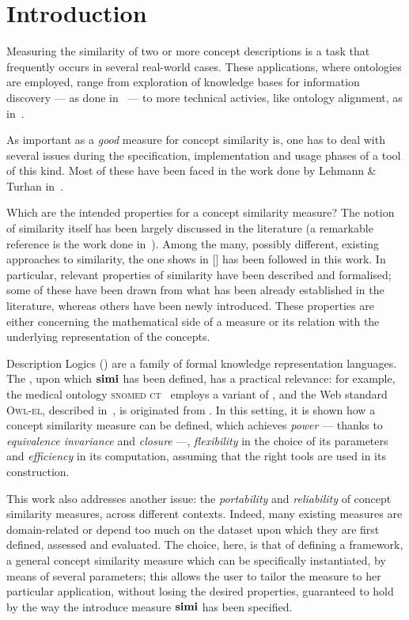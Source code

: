 \section{Introduction}
\label{sec:intro}

Measuring the similarity of two or more concept descriptions is a task that frequently occurs in several real-world cases.
These applications, where ontologies are employed, range from exploration of knowledge bases for information discovery --- as done in~\cite{GF13} --- to more technical activies, like ontology alignment, as in~\cite{CHu11}.


As important as a \emph{good} measure for concept similarity is, one has to deal with several issues during the specification, implementation and usage phases of a tool of this kind.
Most of these have been faced in the work done by Lehmann \& Turhan in~\cite{LeTu12}.

Which are the intended properties for a concept similarity measure?
The notion of similarity itself has been largely discussed in the literature (a remarkable reference is the work done in~\cite{Tve77}).
Among the many, possibly different, existing approaches to similarity, the one shows in [] has been followed in this work.
In particular, relevant properties of similarity have been described and formalised; some of these have been drawn from what has been already established in the literature, whereas others have been newly introduced.
These properties are either concerning the mathematical side of a measure or its relation with the underlying representation of the concepts.

Description Logics (\dl) are a family of formal knowledge representation languages.
The \dl \elh, upon which \(\operatorname{\mathbf{simi}}\) has been defined, has a practical relevance: for example, the medical ontology \textsc{snomed ct}~\cite{snomed} employs a variant of \elh, and the Web standard \textsc{Owl-el}, described in~\cite{owlEL}, is originated from \elh.
In this setting, it is shown how a concept similarity measure can be defined, which achieves \emph{power} --- thanks to \emph{equivalence invariance} and \emph{closure} ---, \emph{flexibility} in the choice of its parameters and \emph{efficiency} in its computation, assuming that the right tools are used in its construction.

This work also addresses another issue: the \emph{portability} and \emph{reliability} of concept similarity measures, across different contexts.
Indeed, many existing measures are domain-related or depend too much on the dataset upon which they are first defined, assessed and evaluated.
The choice, here, is that of defining a framework, a general concept similarity measure which can be specifically instantiated, by means of several parameters; this allows the user to tailor the measure to her particular application, without losing the desired properties, guaranteed to hold by the way the introduce measure \(\operatorname{\mathbf{simi}}\) has been specified.


